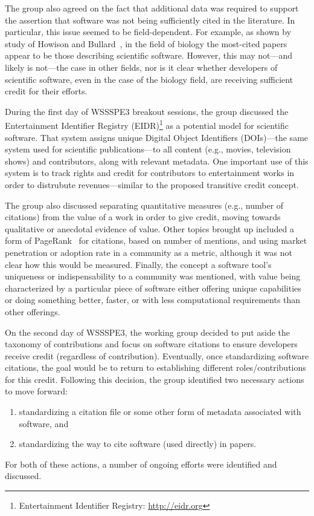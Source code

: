 The group also agreed on the fact that additional data was required to support the assertion that software was not being sufficiently cited in the literature.
In particular, this issue seemed to be field-dependent.
For example, as shown by study of Howison and Bullard~\cite{Howison2015}, in the field of biology the most-cited papers appear to be those describing scientific software.
However, this may not---and likely is not---the case in other fields, nor is it clear whether developers of scientific software, even in the case of the biology field, are receiving sufficient credit for their efforts.

During the first day of WSSSPE3 breakout sessions, the group discussed the Entertainment Identifier Registry (EIDR)\footnote{Entertainment Identifier Registry: \url{http://eidr.org}} as a potential model for scientific software.
That system assigns unique Digital Object Identifiers (DOIs)---the same system used for scientific publications---to all content (e.g., movies, television shows) and contributors, along with relevant metadata.
One important use of this system is to track rights and credit for contributors to entertainment works in order to distrubute revenues---similar to the proposed transitive credit concept.

The group also discussed separating quantitative measures (e.g., number of citations) from the value of a work in order to give credit, moving towards qualitative or anecdotal evidence of value.
Other topics brought up included a form of PageRank~\cite{Brin1998} for citations, based on number of mentions, and using market penetration or adoption rate in a community as a metric, although it was not clear how this would be measured.
Finally, the concept a software tool's uniqueness or indispensability to a community was mentioned, with value being characterized by a particular piece of software either offering unique capabilities or doing something better, faster, or with less computational requirements than other offerings.

On the second day of WSSSPE3, the working group decided to put aside the taxonomy of contributions and focus on software citations to ensure developers receive credit (regardless of contribution).
Eventually, once standardizing software citations, the goal would be to return to establishing different roles\slash contributions for this credit.
Following this decision, the group identified two necessary actions to move forward:
\begin{enumerate}
    \item standardizing a citation file or some other form of metadata associated with software, and
    \item standardizing the way to cite software (used directly) in papers.
\end{enumerate}
For both of these actions, a number of ongoing efforts were identified and discussed.

